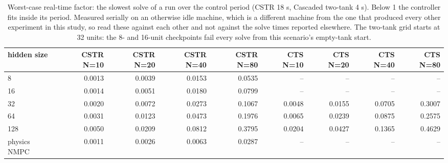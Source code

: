 \begin{table}
\caption{Worst-case real-time factor: the slowest solve of a run over the control period (CSTR 18 s, Cascaded two-tank 4 s). Below 1 the controller fits inside its period. Measured serially on an otherwise idle machine, which is a different machine from the one that produced every other experiment in this study, so read these against each other and not against the solve times reported elsewhere. The two-tank grid starts at 32 units: the 8- and 16-unit checkpoints fail every solve from this scenario's empty-tank start.}
\label{tab:T4_rtf_wcet_grid}
\begin{tabular}{lrrrrrrrr}
\toprule
hidden size & CSTR N=10 & CSTR N=20 & CSTR N=40 & CSTR N=80 & CTS N=10 & CTS N=20 & CTS N=40 & CTS N=80 \\
\midrule
8 & 0.0013 & 0.0039 & 0.0153 & 0.0535 & -- & -- & -- & -- \\
16 & 0.0014 & 0.0051 & 0.0180 & 0.0799 & -- & -- & -- & -- \\
32 & 0.0020 & 0.0072 & 0.0273 & 0.1067 & 0.0048 & 0.0155 & 0.0705 & 0.3007 \\
64 & 0.0031 & 0.0123 & 0.0473 & 0.1976 & 0.0065 & 0.0239 & 0.0875 & 0.2575 \\
128 & 0.0050 & 0.0209 & 0.0812 & 0.3795 & 0.0204 & 0.0427 & 0.1365 & 0.4629 \\
physics NMPC & 0.0011 & 0.0026 & 0.0063 & 0.0287 & -- & -- & -- & -- \\
\bottomrule
\end{tabular}
\end{table}

